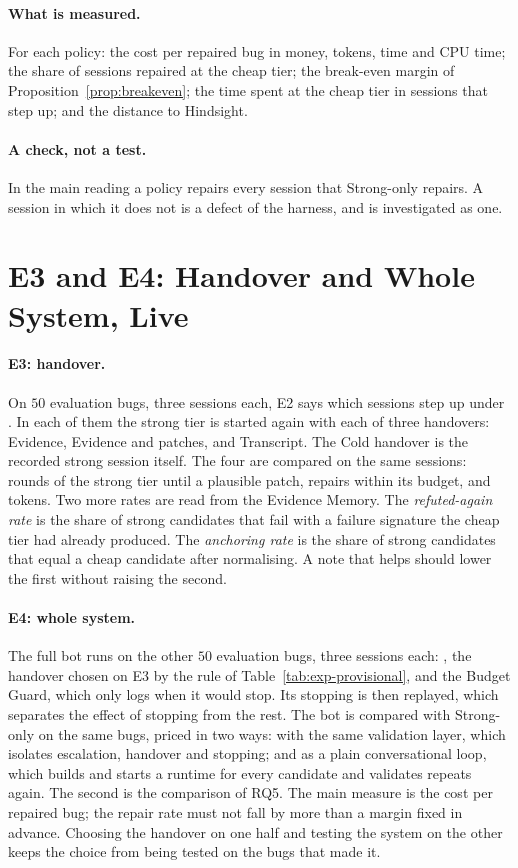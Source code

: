 \paragraph{What is measured.} For each policy: the cost per repaired bug in
money, tokens, time and CPU time; the share of sessions repaired at the cheap
tier; the break-even margin of Proposition~\ref{prop:breakeven}; the time
spent at the cheap tier in sessions that step up; and the distance to
Hindsight.

\paragraph{A check, not a test.} In the main reading a policy repairs every
session that Strong-only repairs. A session in which it does not is a defect
of the harness, and is investigated as one.

\section{E3 and E4: Handover and Whole System, Live}
\label{sec:exp-live}

\paragraph{E3: handover.} On $50$ evaluation bugs, three sessions each, E2
says which sessions step up under \Step. In each of them the strong tier is
started again with each of three handovers: Evidence, Evidence and patches,
and Transcript. The Cold handover is the recorded strong session itself. The
four are compared on the same sessions: rounds of the strong tier until a
plausible patch, repairs within its budget, and tokens. Two more rates are
read from the Evidence Memory. The \emph{refuted-again rate} is the share of
strong candidates that fail with a failure signature the cheap tier had
already produced. The \emph{anchoring rate} is the share of strong candidates
that equal a cheap candidate after normalising. A note that helps should lower
the first without raising the second.

\paragraph{E4: whole system.} The full bot runs on the other $50$ evaluation
bugs, three sessions each: \Step, the handover chosen on E3 by the rule of
Table~\ref{tab:exp-provisional}, and the Budget Guard, which only logs when it
would stop. Its stopping is then replayed, which separates the effect of
stopping from the rest. The bot is compared with Strong-only on the same bugs,
priced in two ways: with the same validation layer, which isolates escalation,
handover and stopping; and as a plain conversational loop, which builds and
starts a runtime for every candidate and validates repeats again. The second
is the comparison of RQ5. The main measure is the cost per repaired bug; the
repair rate must not fall by more than a margin fixed in advance. Choosing the
handover on one half and testing the system on the other keeps the choice from
being tested on the bugs that made it.

